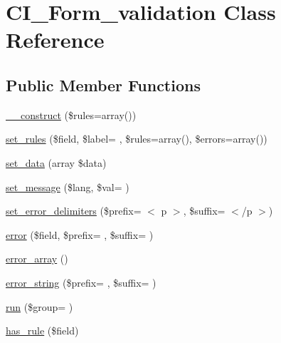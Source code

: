 \hypertarget{class_c_i___form__validation}{}\section{C\+I\+\_\+\+Form\+\_\+validation Class Reference}
\label{class_c_i___form__validation}
\subsection*{Public Member Functions}
\begin{DoxyCompactItemize}
\item 
\hyperlink{class_c_i___form__validation_ac7224a1f92da249b312d1400c459ba83}{\+\_\+\+\_\+construct} (\$rules=array())
\item 
\hyperlink{class_c_i___form__validation_a12b385f16f569e8f1397adfb8ad15fb7}{set\+\_\+rules} (\$field, \$label= \textquotesingle{}\textquotesingle{}, \$rules=array(), \$errors=array())
\item 
\hyperlink{class_c_i___form__validation_af211c000380b8b345c6eb102cb5ca453}{set\+\_\+data} (array \$data)
\item 
\hyperlink{class_c_i___form__validation_a09634765920fbb178a76fcf9690e0e86}{set\+\_\+message} (\$lang, \$val= \textquotesingle{}\textquotesingle{})
\item 
\hyperlink{class_c_i___form__validation_af8f2dc3325362faef29ccf64b7f3fb27}{set\+\_\+error\+\_\+delimiters} (\$prefix= \textquotesingle{}$<$ p $>$\textquotesingle{}, \$suffix= \textquotesingle{}$<$/p $>$\textquotesingle{})
\item 
\hyperlink{class_c_i___form__validation_a080fb4506a943d246e3af2c8325b10e1}{error} (\$field, \$prefix= \textquotesingle{}\textquotesingle{}, \$suffix= \textquotesingle{}\textquotesingle{})
\item 
\hyperlink{class_c_i___form__validation_a477a3b8cbc925367d5b6880c48a9b42a}{error\+\_\+array} ()
\item 
\hyperlink{class_c_i___form__validation_a583ab6b5d353cca33fdd076c364dbdf3}{error\+\_\+string} (\$prefix= \textquotesingle{}\textquotesingle{}, \$suffix= \textquotesingle{}\textquotesingle{})
\item 
\hyperlink{class_c_i___form__validation_adf7a41dbb03750328e510ad6c703c085}{run} (\$group= \textquotesingle{}\textquotesingle{})
\item 
\hyperlink{class_c_i___form__validation_aaf0ef71d3e9ac390f52441f27e4b7786}{has\+\_\+rule} (\$field)
\item 

\end{DoxyCompactItemize}
